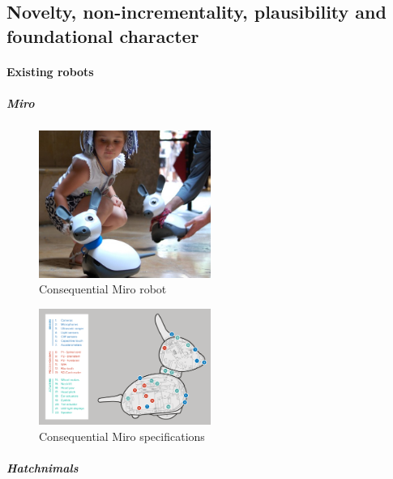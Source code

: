 \documentclass[]{article}
\begin{document}
\subsection{Novelty, non-incrementality, plausibility and foundational
character}\label{novelty-non-incrementality-plausibility-and-foundational-character}

\paragraph{Existing robots}\label{existing-robots}

\subparagraph{Miro}\label{miro}

\begin{figure}
\centering
\includegraphics[width=0.5\textwidth,height=\textheight]{figs/miro.jpg}
\caption{Consequential Miro robot}
\end{figure}

\begin{figure}
\centering
\includegraphics[width=0.5\textwidth,height=\textheight]{figs/miro-spec.png}
\caption{Consequential Miro specifications}
\end{figure}

\subparagraph{Hatchnimals}\label{hatchnimals}
\end{document}
